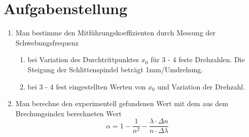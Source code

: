 \section{Aufgabenstellung}

\begin{enumerate}

\item Man bestimme den Mitführungskoeffizienten durch Messung der Schwebungsfrequenz
	\begin{enumerate}
	\item bei Variation des Durchtrittpunktes $x_0$ für 3 - 4 feste Drehzahlen. Die Steigung der Schlittenspindel 		beträgt 1mm/Umdrehung.
	\item bei 3 - 4 fest eingestellten Werten von $x_0$ und Variation der Drehzahl.
	\end{enumerate}
\item Man berechne den experimentell gefundenen Wert mit dem aus dem Brechungsindex berechneten Wert
	$$\alpha = 1 - \frac{1}{n^2} - \frac{\lambda\cdot\Delta n}{n\cdot\Delta\lambda}$$
	
\end{enumerate}